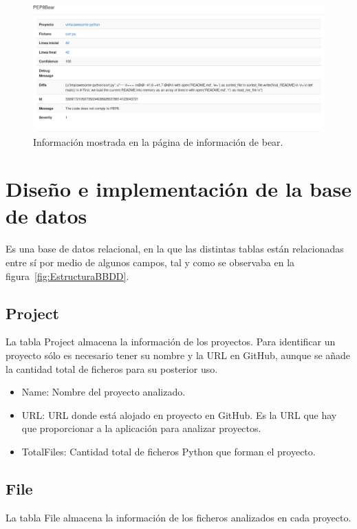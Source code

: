 \documentclass[a4paper, 12pt]{book}
\begin{document}
\begin{figure}[H]
  \centering
  \includegraphics[width=16cm, keepaspectratio]{img/infoBear}
  \caption{Información mostrada en la página de información de bear.}
  \label{fig:infoBear}
\end{figure}

\section{Diseño e implementación de la base de datos} 
\label{sec:seccion14}
Es una base de datos relacional, en la que las distintas tablas están relacionadas entre sí por medio de algunos campos, tal y como se observaba en la figura~\ref{fig:EstructuraBBDD}.

\subsection{Project}
\label{sec:seccion14.1}
La tabla Project almacena la información de los proyectos. Para identificar un proyecto sólo es necesario tener su nombre y la URL en GitHub, aunque se añade la cantidad total de ficheros para su posterior uso.

\begin{itemize}
          \item Name: Nombre del proyecto analizado.
          \item URL: URL donde está alojado en proyecto en GitHub. Es la URL que hay que proporcionar a la aplicación para analizar proyectos.
          \item TotalFiles: Cantidad total de ficheros Python que forman el proyecto.
\end{itemize}

\subsection{File}
\label{sec:seccion14.2}
La tabla File almacena la información de los ficheros analizados en cada proyecto.
\end{document}
